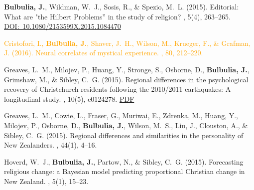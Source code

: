 \documentclass{article}
\begin{document}
\begin{thebibliography}{99}
{\bf Bulbulia, J.}, Wildman, W.~J., Sosis, R., \& Spezio, M.~L. (2015). Editorial:
\newblock What are "the Hilbert Problems'' in the study of religion?
, 5(4), 263--265. 
\href{https://doi.org/ 10.1080/2153599X.2015.1084470}{DOI:~10.1080/2153599X.2015.1084470}


\textcolor{Orange}{Cristofori, I., {\bf Bulbulia, J.}, Shaver, J.~H., Wilson, M., Krueger, F., \& Grafman, J. (2016).
\newblock Neural correlates of mystical experience.
, 80, 212--220. }
 

Greaves, L.~M., Milojev, P., Huang, Y., Stronge, S., Osborne, D., {\bf Bulbulia, J.}, Grimshaw, M., \& Sibley, C.~G. (2015).
\newblock Regional differences in the psychological recovery of Christchurch residents following the 2010/2011 earthquakes: A longitudinal study.
, 10(5), e0124278. 
\href{https://www.dropbox.com/s/5rb1nqsw4eiks05/journal.pone.0124278.pdf?dl=0}{PDF} %


Greaves, L.~M., Cowie, L., Fraser, G., Muriwai, E., Zdrenka, M., Huang, Y., Milojev, P., Osborne, D., {\bf Bulbulia, J.}, Wilson, M.~S., Liu, J., Clouston, A., \& Sibley, C.~G. (2015).
\newblock Regional differences and similarities in the personality of {N}ew {Z}ealanders.
, 44(1), 4--16.


Hoverd, W.~J., {\bf Bulbulia, J.}, Partow, N., \& Sibley, C.~G. (2015).
\newblock Forecasting religious change: a Bayesian model predicting
  proportional Christian change in New Zealand.
, 5(1), 15--23. 



\end{thebibliography}
\end{document}
